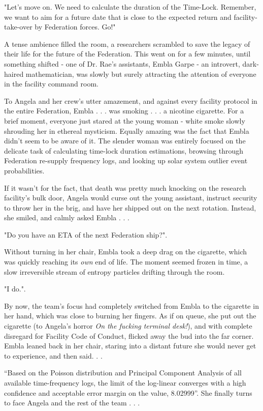 \documentclass[smalldemyvopaper,11pt,twoside,onecolumn,openright,extrafontsizes]{memoir}
\begin{document}
 
 "Let’s move on. We need to calculate the duration of the Time-Lock. Remember, we want to aim for a future date that is close to the expected return and facility-take-over by Federation forces. Go!"

 
 A tense ambience filled the room, a researchers scrambled to save the legacy of their life for the future of the Federation. This went on for a few minutes, until something shifted - one of Dr. Rae’s assistants, Embla Garpe - an introvert, dark-haired mathematician, was slowly but surely attracting the attention of everyone in the facility command room.

 
  To Angela and her crew’s utter amazement, and against every facility protocol in the entire Federation, Embla . . . was smoking . . . a nicotine cigarette. For a brief moment, everyone just stared at the young woman - white smoke slowly shrouding her in ethereal mysticism. Equally amazing was the fact that Embla didn’t seem to be aware of it. The slender woman was entirely focused on the delicate task of calculating time-lock duration estimations, browsing through Federation re-supply frequency logs, and looking up solar system outlier event probabilities.

 
 If it wasn’t for the fact, that death was pretty much knocking on the research facility’s bulk door, Angela would curse out the young assistant, instruct security to throw her in the brig, and have her shipped out on the next rotation. Instead, she smiled, and calmly asked Embla . . .

 
 "Do you have an ETA of the next Federation ship?".

 
 Without turning in her chair, Embla took a deep drag on the cigarette, which was quickly reaching its \textit{own} end of life. The moment seemed frozen in time, a slow irreversible stream of entropy particles drifting through the room.

 
 "I do.".

 
 By now, the team’s focus had completely switched from Embla to the cigarette in her hand, which was close to burning her fingers. As if on queue, she put out the cigarette (to Angela’s horror \textit{On the fucking terminal desk!}), and with complete disregard for Facility Code of Conduct, flicked away the bud into the far corner. Embla leaned back in her chair, staring into a distant future she would never get to experience, and then said. . .

 
 “Based on the Poisson distribution and Principal Component Analysis of all available time-frequency logs, the limit of the log-linear converges with a high confidence and acceptable error margin on the value, 8.02999”. She finally turns to face Angela and the rest of the team . . .
\end{document}
